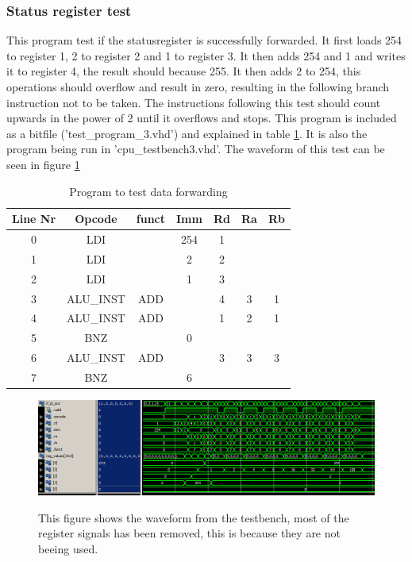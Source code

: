 \documentclass[11pt]{report}
\begin{document}
\subsubsection*{Status register test}

This program test if the statusregister is successfully forwarded.
It first loads 254 to register 1, 2 to register 2 and 1 to register 3.
It then adds 254 and 1 and writes it to register 4, the result should because
255. It then adds 2 to 254, this operations should overflow and result in zero,
resulting in the following branch instruction not to be taken. The instructions
following this test should count upwards in the power of 2 until it overflows
and stops. This program is included as a bitfile ('test\_program\_3.vhd') and
explained in table \ref{tab:program3table}. It is also the program being run in 'cpu\_testbench3.vhd'.
The waveform of this test can be seen in figure \ref{fig:program3wave}

\begin{table}[htbp]
  \centering
  \begin{tabular}{|c|c|c|c|c|c|c|}
    \hline
    Line Nr &	Opcode		&	funct	&	Imm	&	Rd	&	Ra	&	Rb	\\\hline
    	0	&	LDI			&			&	254	&	1	&		&		\\\hline
    	1	&	LDI			&			&	2	&	2	&		&		\\\hline
    	2	&	LDI			&			&	1	&	3	&		&		\\\hline
    	3	&	ALU\_INST	&	ADD		&		&	4	&	3	&	1	\\\hline
    	4	&	ALU\_INST	&	ADD		&		&	1	&	2	&	1	\\\hline
    	5	&	BNZ			&			&	0	&		&		&		\\\hline
    	6	&	ALU\_INST	&	ADD		&		&	3	&	3	&	3	\\\hline
    	7	&	BNZ			&			&	6	&		&		&		\\\hline

  \end{tabular}
  \caption{Program to test data forwarding}
  \label{tab:program3table}
\end{table}

\begin{figure}
  \centering
  \includegraphics[width=.95\linewidth]{test3.png} \\
  \caption{This figure shows the waveform from the testbench, 
  most of the register signals has been removed, this is because they are not beeing used.}
  \label{fig:program3wave}
\end{figure}
\end{document}
